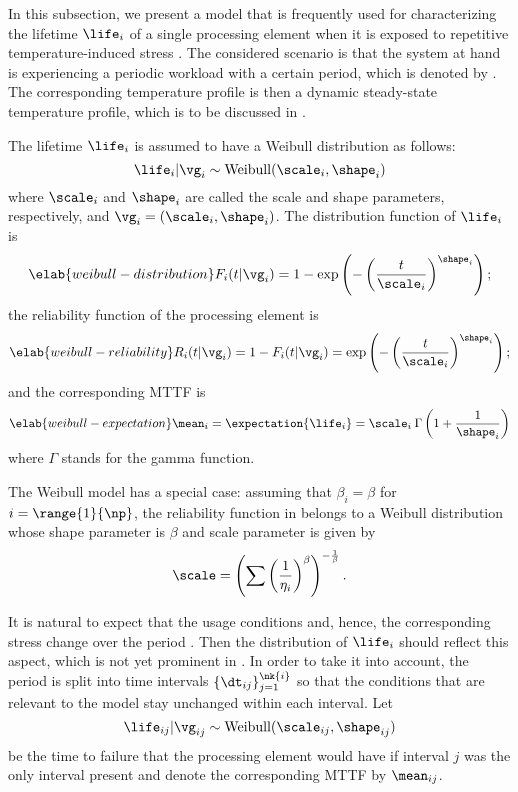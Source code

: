 In this subsection, we present a model that is frequently used for
characterizing the lifetime $\life_i$ of a single processing element when it is
exposed to repetitive temperature-induced stress \cite{huang2009b, xiang2010}.
The considered scenario is that the system at hand is experiencing a periodic
workload with a certain period, which is denoted by \period. The corresponding
temperature profile is then a dynamic steady-state temperature profile, which is
to be discussed in .

The lifetime $\life_i$ is assumed to have a Weibull distribution as follows:
\[
  \life_i | \vg_i \sim \mathrm{Weibull}(\scale_i, \shape_i)
\]
where $\scale_i$ and $\shape_i$ are called the scale and shape parameters,
respectively, and $\vg_i = (\scale_i, \shape_i)$. The distribution function of
$\life_i$ is
\begin{equation} \elab{weibull-distribution}
  F_i(t | \vg_i) = 1 - \exp\left(-\left(\frac{t}{\scale_i}\right)^{\shape_i}\right);
\end{equation}
the reliability function of the processing element is
\begin{equation} \elab{weibull-reliability}
  R_i(t | \vg_i) = 1 - F_i(t | \vg_i) = \exp\left(-\left(\frac{t}{\scale_i}\right)^{\shape_i}\right);
\end{equation}
and the corresponding \ac{MTTF} is
\begin{equation} \elab{weibull-expectation}
  \mean_i = \expectation{\life_i} = \scale_i \: \Gamma\left(1 + \frac{1}{\shape_i}\right)
\end{equation}
where $\Gamma$ stands for the gamma function.

\begin{remark} 
The Weibull model has a special case: assuming that $\beta_i = \beta$ for $i =
\range{1}{\np}$, the reliability function in  belongs to
a Weibull distribution whose shape parameter is $\beta$ and scale parameter is
given by
\[
  \scale = \left(\sum\left(\frac{1}{\eta_i}\right)^\beta\right)^{-\frac{1}{\beta}}.
\]
\end{remark}

It is natural to expect that the usage conditions and, hence, the corresponding
stress change over the period \period. Then the distribution of $\life_i$ should
reflect this aspect, which is not yet prominent in .
In order to take it into account, the period is split into  time intervals
$\{ \dt_{ij} \}_{j = 1}^{\nk{i}}$ so that the conditions that are relevant to
the model stay unchanged within each interval. Let
\[
  \life_{ij} | \vg_{ij} \sim \mathrm{Weibull}(\scale_{ij}, \shape_{ij})
\]
be the time to failure that the processing element would have if interval $j$
was the only interval present and denote the corresponding \ac{MTTF} by
$\mean_{ij}$.

